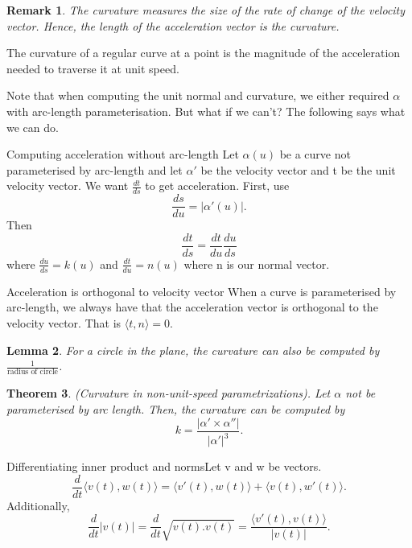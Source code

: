 \documentclass[twoside]{article}
\newcounter{lecnum}
\newtheorem{theorem}{Theorem}[lecnum]
\newtheorem{lemma}[theorem]{Lemma}
\newtheorem{remark}[theorem]{Remark}
\begin{document}
\begin{remark}The curvature measures the size of the rate of change of the velocity vector. Hence, the length of the acceleration vector is the curvature.
\end{remark}

The curvature of a regular curve at a point is the magnitude of the acceleration needed to traverse it at unit speed.\newline

Note that when computing the unit normal and curvature, we either required $\alpha$ with arc-length parameterisation. But what if we can't? The following says what we can do.
\begin{proposition_exam}{Computing acceleration without arc-length}{} Let $\alpha(u)$ be a curve not parameterised by arc-length and let $\alpha'$ be the velocity vector and t be the unit velocity vector. We want $\frac{dt}{ds}$ to get acceleration. First, use 
$$
\frac{ds}{du} = |\alpha'(u)|.
$$
Then 
$$
\frac{dt}{ds} = \frac{dt}{du}\frac{du}{ds}
$$
where $\frac{du}{ds} = k(u)$ and $\frac{dt}{du} = n(u)$ where n is our normal vector.
\end{proposition_exam}

\begin{proposition_exam}{Acceleration is orthogonal to velocity vector}{}
When a curve is parameterised by arc-length, we always have that the acceleration vector is orthogonal to the velocity vector. That is $\langle t, n \rangle = 0.$
\end{proposition_exam}

\begin{lemma}For a circle in the plane, the curvature can also be computed by $\frac{1}{\text{radius of circle}}$.
\end{lemma}

\begin{theorem}(Curvature in non-unit-speed parametrizations). Let $\alpha$ not be parameterised by arc length. Then, the curvature can be computed by 
$$
k = \frac{|\alpha' \times \alpha''|}{|\alpha'|^{3}}.
$$
\end{theorem}

\begin{theorem_exam}{Differentiating inner product and norms}{}Let v and w be vectors.
$$
\frac{d}{dt}\langle v(t), w(t) \rangle = \langle v'(t), w(t) \rangle + \langle v(t), w'(t) \rangle.
$$
Additionally, 
$$
\frac{d}{dt}|v(t)| = \frac{d}{dt}\sqrt{v(t).v(t)} = \frac{\langle v'(t), v(t) \rangle}{|v(t)|}.
$$
\end{theorem_exam}
\end{document}

